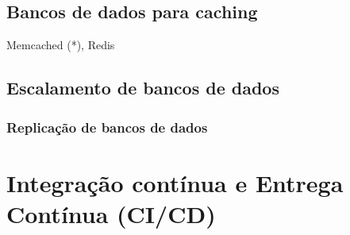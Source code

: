\subsection{Bancos de dados para caching}
Memcached (*), Redis

\subsection{Escalamento de bancos de dados}

\subsubsection{Replicação de bancos de dados}




\section{Integração contínua e Entrega Contínua (CI/CD)}








